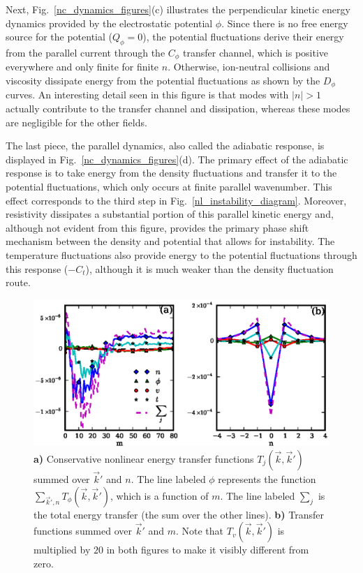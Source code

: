 \documentclass[showpacs,preprintnumbers,amsmath,amssymb,superscriptaddress,aip]{revtex4-1}
\begin{document}
Next, Fig.~\ref{nc_dynamics_figures}(c) illustrates the perpendicular kinetic energy dynamics provided by the electrostatic potential $\phi$. 
Since there is no free energy source for the potential ($Q_\phi=0$),
the potential fluctuations derive their energy from the parallel current through the $C_\phi$ transfer channel, which is positive everywhere and only finite for finite $n$. Otherwise, ion-neutral
collisions and viscosity dissipate energy from the potential fluctuations as shown by the $D_\phi$ curves. An interesting detail seen in this figure is that modes with $|n| > 1$ actually
contribute to the transfer channel and dissipation, whereas these modes are negligible for the other fields. 

The last piece, the parallel dynamics, also called the adiabatic response, is displayed in Fig.~\ref{nc_dynamics_figures}(d). 
The primary effect of the adiabatic response is to take energy from the density
fluctuations and transfer it to the potential fluctuations, which only occurs at finite parallel wavenumber. This effect corresponds to the third step in Fig.~\ref{nl_instability_diagram}.
Moreover, resistivity dissipates a substantial portion of this
parallel kinetic energy and, although not evident from this figure, provides
the primary phase shift mechanism between the density and potential that allows for instability. The temperature fluctuations also provide energy to the potential fluctuations
through this response ($-C_t$), although it is much weaker than the density fluctuation route. 


\begin{figure}[!htbp]
\includegraphics[]{nl_dynamics}
\hfil
\caption{\textbf{a)} Conservative nonlinear energy transfer functions $T_j(\vec{k},\vec{k}')$ summed over $\vec{k}'$ and $n$. 
The line labeled $\phi$ represents the function $\sum_{\vec{k}',n} T_\phi(\vec{k},\vec{k}')$,
which is a function of $m$. The line labeled $\sum_j$ is the total energy transfer (the sum over the other lines).
\textbf{b)} Transfer functions summed over $\vec{k}'$ and $m$. Note that $T_v(\vec{k},\vec{k}')$ is multiplied by $20$ in both figures to make it visibly different from zero.}
\label{conservative_transfers}
\end{figure}
\end{document}
